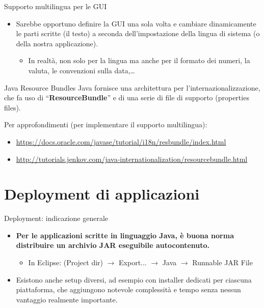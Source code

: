 \documentclass[presentation]{beamer}
\begin{document}
\begin{frame}{Supporto multilingua per le GUI}
\begin{itemize}
\item Sarebbe opportuno definire la GUI una sola volta e cambiare dinamicamente le parti scritte (il testo) a seconda dell'impostazione della lingua di sistema (o della nostra applicazione).
\begin{itemize}
\item In realtà, non solo per la lingua ma anche per il formato dei numeri, la valuta, le convenzioni sulla data,\dots
\end{itemize}
\end{itemize}
\begin{block}{Java Resource Bundles}
Java fornisce una architettura per l'internazionalizzazione, che fa uso di ``\textbf{ResourceBundle}'' e di una serie di file di supporto (properties files).

Per approfondimenti (per implementare il supporto multilingua):
\begin{itemize}
\item \url{https://docs.oracle.com/javase/tutorial/i18n/resbundle/index.html}
\item \url{http://tutorials.jenkov.com/java-internationalization/resourcebundle.html}
\end{itemize}
\end{block}
\end{frame}

\section{Deployment di applicazioni}

\begin{frame}{Deployment: indicazione generale}
\begin{itemize}\itemsep20pt
\item \textbf{Per le applicazioni scritte in linguaggio Java, è buona norma distribuire un archivio JAR eseguibile autocontenuto.}
\begin{itemize}
\item In Eclipse: (Project dir) $\rightarrow$ Export... $\rightarrow$ Java $\rightarrow$ Runnable JAR File
\end{itemize}
\item Esistono anche setup diversi, ad esempio con installer dedicati per ciascuna piattaforma, che aggiungono notevole complessità e tempo senza nessun vantaggio realmente importante.
\end{itemize}

\end{frame}
\end{document}
